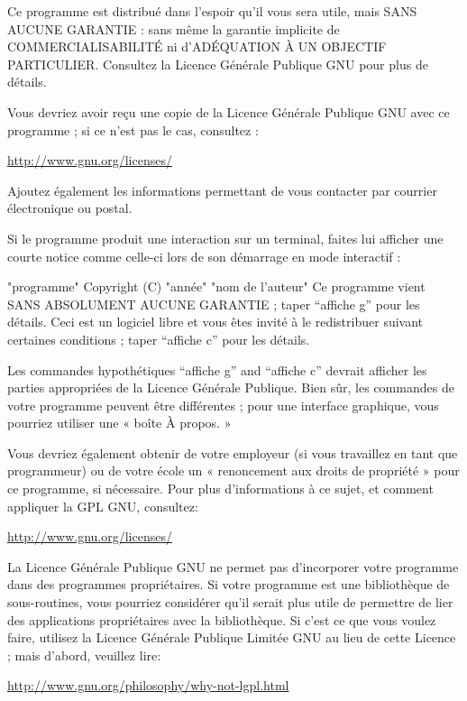 {  Ce programme est distribué dans l’espoir qu’il vous sera utile, mais SANS
  AUCUNE GARANTIE : sans même la garantie implicite de COMMERCIALISABILITÉ
  ni d’ADÉQUATION À UN OBJECTIF PARTICULIER. Consultez la Licence Générale
  Publique GNU pour plus de détails.
  
  Vous devriez avoir reçu une copie de la Licence Générale Publique GNU avec
  ce programme ; si ce n’est pas le cas, consultez :
\begin{center}
\href{http://www.gnu.org/licenses/}{http://www.gnu.org/licenses/}
\end{center}

Ajoutez également les informations permettant de vous contacter par
courrier électronique ou postal.

Si le programme produit une interaction sur un terminal, faites lui
afficher une courte notice comme celle-ci lors de son démarrage en mode
interactif :

  "programme" Copyright (C) "année" "nom de l’auteur"
  Ce programme vient SANS ABSOLUMENT AUCUNE GARANTIE ; taper “affiche g” pour
  les détails. Ceci est un logiciel libre et vous êtes invité à le redistribuer
  suivant certaines conditions ; taper “affiche c” pour les détails.

Les commandes hypothétiques “affiche g” and “affiche c” devrait
afficher les parties appropriées de la Licence Générale Publique. Bien
sûr, les commandes de votre programme peuvent être différentes ; pour
une interface graphique, vous pourriez utiliser une « boîte À propos. »

Vous devriez également obtenir de votre employeur (si vous travaillez
en tant que programmeur) ou de votre école un « renoncement aux droits
de propriété » pour ce programme, si nécessaire. Pour plus
d’informations à ce sujet, et comment appliquer la GPL GNU, consultez:
\begin{center}
\href{http://www.gnu.org/licenses/}{http://www.gnu.org/licenses/}
\end{center}

La Licence Générale Publique GNU ne permet pas d’incorporer votre
programme dans des programmes propriétaires. Si votre programme est une
bibliothèque de sous-routines, vous pourriez considérer qu’il serait
plus utile de permettre de lier des applications propriétaires avec la
bibliothèque. Si c’est ce que vous voulez faire, utilisez la Licence
Générale Publique Limitée GNU au lieu de cette Licence ; mais d’abord,
veuillez lire:
\begin{center}
 \href{http://www.gnu.org/philosophy/why-not-lgpl.html}{http://www.gnu.org/philosophy/why-not-lgpl.html}
\end{center}






}
\endinput
